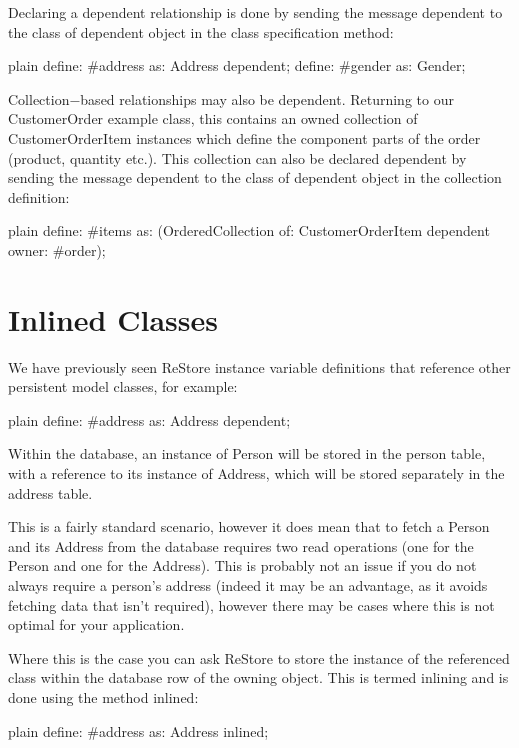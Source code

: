 \documentclass[10pt,twoside,english]{_support/latex/sbabook/sbabook}
\begin{document}
Declaring a dependent relationship is done by sending the message dependent to the class of dependent object in the class specification method: 

\begin{displaycode}{plain}
	define: #address as: Address dependent;
	define: #gender as: Gender;
\end{displaycode}

Collection−based relationships may also be dependent. Returning to our CustomerOrder example class, this contains an owned collection of CustomerOrderItem instances which define the component parts of the order (product, quantity etc.). This collection can also be declared dependent by sending the message dependent to the class of dependent object in the collection definition: 

\begin{displaycode}{plain}
	define: #items as: (OrderedCollection of: CustomerOrderItem dependent owner: #order);
\end{displaycode}
\section{Inlined Classes}
We have previously seen ReStore instance variable definitions that reference other persistent model classes, for example:

\begin{displaycode}{plain}
	define: #address as: Address dependent;
\end{displaycode}

Within the database, an instance of Person will be stored in the person table, with a reference to its instance of Address, which will be stored separately in the address table. 

This is a fairly standard scenario, however it does mean that to fetch a Person and its Address from the database requires two read operations (one for the Person and one for the Address). This is probably not an issue if you do not always require a person’s address (indeed it may be an advantage, as it avoids fetching data that isn’t required), however there may be cases where this is not optimal for your application.

Where this is the case you can ask ReStore to store the instance of the referenced class within the database row of the owning object. This is termed inlining and is done using the method inlined:

\begin{displaycode}{plain}
	define: #address as: Address inlined;
\end{displaycode}
\end{document}
